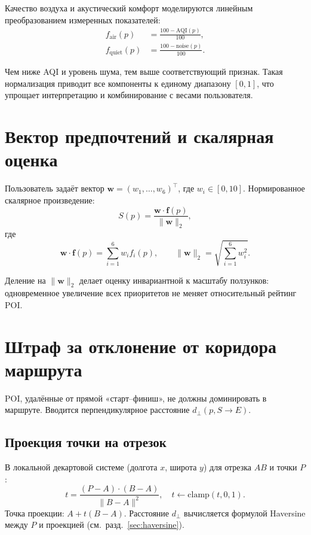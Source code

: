 Качество воздуха и акустический комфорт моделируются линейным преобразованием
измеренных показателей:
\begin{align}
  f_{\text{air}}(p) &= \frac{100 - \mathrm{AQI}(p)}{100}, \label{eq:air} \\
  f_{\text{quiet}}(p) &= \frac{100 - \mathrm{noise}(p)}{100}. \label{eq:quiet}
\end{align}

Чем ниже AQI и уровень шума, тем выше соответствующий признак. Такая нормализация
приводит все компоненты к единому диапазону $[0, 1]$, что упрощает интерпретацию
и комбинирование с весами пользователя.

\section{Вектор предпочтений и скалярная оценка}

Пользователь задаёт вектор $\mathbf{w} = (w_1, \ldots, w_6)^\top$, где
$w_i \in [0, 10]$. Нормированное скалярное произведение:
\begin{equation}
  S(p) = \frac{\mathbf{w} \cdot \mathbf{f}(p)}{\|\mathbf{w}\|_2},
  \label{eq:dot-score}
\end{equation}
где
\begin{equation}
  \mathbf{w} \cdot \mathbf{f}(p) = \sum_{i=1}^{6} w_i f_i(p), \qquad
  \|\mathbf{w}\|_2 = \sqrt{\sum_{i=1}^{6} w_i^2}.
  \label{eq:norm}
\end{equation}

Деление на $\|\mathbf{w}\|_2$ делает оценку инвариантной к масштабу ползунков:
одновременное увеличение всех приоритетов не меняет относительный рейтинг POI.

\section{Штраф за отклонение от коридора маршрута}

POI, удалённые от прямой «старт--финиш», не должны доминировать в маршруте.
Вводится перпендикулярное расстояние $d_\perp(p, S \to E)$.

\subsection{Проекция точки на отрезок}

В локальной декартовой системе (долгота $x$, широта $y$) для отрезка $AB$ и точки $P$:
\begin{equation}
  t = \frac{(P - A) \cdot (B - A)}{\|B - A\|^2}, \quad t \leftarrow \mathrm{clamp}(t, 0, 1).
  \label{eq:projection}
\end{equation}
Точка проекции: $A + t(B - A)$. Расстояние $d_\perp$ вычисляется формулой Haversine
между $P$ и проекцией (см.~разд.~\ref{sec:haversine}).

